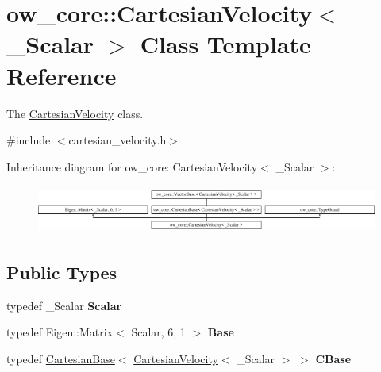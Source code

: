 \hypertarget{classow__core_1_1CartesianVelocity}{}\section{ow\+\_\+core\+:\+:Cartesian\+Velocity$<$ \+\_\+\+Scalar $>$ Class Template Reference}
\label{classow__core_1_1CartesianVelocity}


The \hyperlink{classow__core_1_1CartesianVelocity}{Cartesian\+Velocity} class.  




{\ttfamily \#include $<$cartesian\+\_\+velocity.\+h$>$}

Inheritance diagram for ow\+\_\+core\+:\+:Cartesian\+Velocity$<$ \+\_\+\+Scalar $>$\+:\begin{figure}[H]
\begin{center}
\leavevmode
\includegraphics[height=1.604584cm]{d5/df0/classow__core_1_1CartesianVelocity}
\end{center}
\end{figure}
\subsection*{Public Types}
\begin{DoxyCompactItemize}
\item 
typedef \+\_\+\+Scalar {\bfseries Scalar}\hypertarget{classow__core_1_1CartesianVelocity_a30fbc2ff4d9a2902e22c1013d5c79adf}{}\label{classow__core_1_1CartesianVelocity_a30fbc2ff4d9a2902e22c1013d5c79adf}

\item 
typedef Eigen\+::\+Matrix$<$ Scalar, 6, 1 $>$ {\bfseries Base}\hypertarget{classow__core_1_1CartesianVelocity_afb19f3c2efe2446b76a716a0809e960f}{}\label{classow__core_1_1CartesianVelocity_afb19f3c2efe2446b76a716a0809e960f}

\item 
typedef \hyperlink{classow__core_1_1CartesianBase}{Cartesian\+Base}$<$ \hyperlink{classow__core_1_1CartesianVelocity}{Cartesian\+Velocity}$<$ \+\_\+\+Scalar $>$ $>$ {\bfseries C\+Base}\hypertarget{classow__core_1_1CartesianVelocity_a44f123c6c4b46572f9367dea200acb2f}{}\label{classow__core_1_1CartesianVelocity_a44f123c6c4b46572f9367dea200acb2f}

\end{DoxyCompactItemize}
